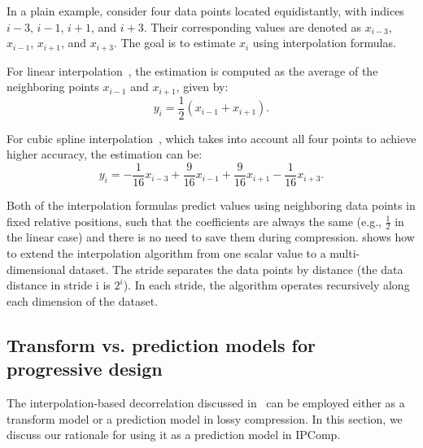 In a plain example, consider four data points located equidistantly, with indices $i-3$, $i-1$, $i+1$, and $i+3$. Their corresponding values are denoted as $x_{i-3}$, $x_{i-1}$, $x_{i+1}$, and $x_{i+3}$. The goal is to estimate $x_i$ using interpolation formulas. 

For linear interpolation~\cite{interp}, the estimation is computed as the average of the neighboring points $x_{i-1}$ and $x_{i+1}$, given by:
\begin{equation}
y_i = \frac{1}{2}(x_{i-1} + x_{i+1}).    
\label{eq:interp-linear}
\end{equation}

For cubic spline interpolation~\cite{interp}, which takes into account all four points to achieve higher accuracy, the estimation can be:
\begin{equation}
y_i = -\frac{1}{16}x_{i-3} + \frac{9}{16}x_{i-1} + \frac{9}{16}x_{i+1} - \frac{1}{16}x_{i+3}.
\label{eq:interp-cubic}
\end{equation}

Both of the interpolation formulas predict values using neighboring data points in fixed relative positions, such that the coefficients are always the same (e.g., $\frac{1}{2}$ in the linear case) and there is no need to save them during compression.
 shows how to extend the interpolation algorithm from one scalar value to a multi-dimensional dataset. The stride separates the data points by distance (the data distance in stride i is $2^i$). In each stride, the algorithm operates recursively along each dimension of the dataset. 










\subsection{Transform vs. prediction models for progressive design}
\label{sec: design transform-vs-predict}
The interpolation-based decorrelation discussed in~ can be employed either as a transform model or a prediction model in lossy compression. In this section, we discuss our rationale for using it as a prediction model in IPComp.

